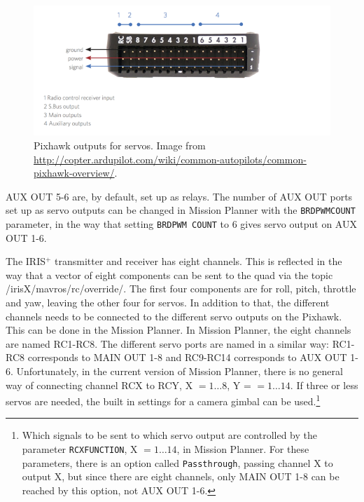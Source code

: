 \documentclass[titlepage,11pt,a4paper]{article}
\begin{document}
\begin{figure}[h!]                                                               
  \centering
  \includegraphics[width=1.0\textwidth]{figures/pixhawk_outputs}
  \caption{Pixhawk outputs for servos. Image from
    \url{http://copter.ardupilot.com/wiki/common-autopilots/common-pixhawk-overview/}.}
  \label{fig:pixhawk_outputs}                                                              
\end{figure}

AUX OUT 5-6 are, by default, set up as relays. The number of AUX OUT
ports set up as servo outputs can be changed in Mission Planner with
the \texttt{BRD\textunderscore PWM\textunderscore COUNT} parameter, in
the way that setting \texttt{BRD\textunderscore PWM\textunderscore
 COUNT} to 6 gives servo output on AUX OUT 1-6.

The IRIS$^+$ transmitter and receiver has eight channels. This is
reflected in the way that a vector of eight components can be sent to
the quad via the topic /irisX/mavros/rc/override/. The first four
components are for roll, pitch, throttle and yaw, leaving the other
four for servos. In addition to that, the different channels needs to
be connected to the different servo outputs on the Pixhawk. This can
be done in the Mission Planner. In Mission Planner, the eight channels
are named RC1-RC8. The different servo ports are named in a similar
way: RC1-RC8 corresponds to MAIN OUT 1-8 and RC9-RC14 corresponds to
AUX OUT 1-6. Unfortunately, in the current version of Mission Planner,
there is no general way of connecting channel RCX to RCY, X $= 1 \dots
8$, Y = $= 1 \dots 14$. If three or less servos are needed, the built
in settings for a camera gimbal can be used.\footnote{Which signals to
be sent to which servo output are controlled by the parameter
\texttt{RCX\textunderscore FUNCTION}, X $= 1 \dots 14$, in Mission
Planner. For these parameters, there is an option called
\texttt{Passthrough}, passing channel X to output X, but since there
are eight channels, only MAIN OUT 1-8 can be reached by this option,
not AUX OUT 1-6.}
\end{document}

